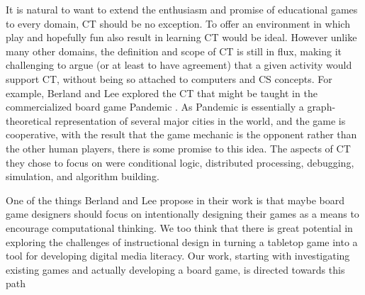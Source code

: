 \documentclass{acm_proc_article-sp}
\begin{document}
It is natural to want to extend the enthusiasm and promise of educational games to every domain, CT should be no exception.
To offer an environment in which play and hopefully fun also result in learning CT would be ideal.
However unlike many other domains, the definition and scope of CT is still in flux, making it challenging to argue (or at least to have agreement) that a given activity would support CT, without being so attached to computers and CS concepts.
For example, Berland and Lee explored the CT that might be taught in the commercialized board game Pandemic \cite{berland2011collaborative}.
As Pandemic is essentially a graph-theoretical representation of several major cities in the world, and the game is cooperative, with the result that the game mechanic is the opponent rather than the other human players, there is some promise to this idea.
The aspects of CT they chose to focus on were conditional logic, distributed processing, debugging, simulation, and algorithm building. 

One of the things Berland and Lee propose in their work is that maybe board game designers should focus on intentionally designing their games as a means to encourage computational thinking. 
We too think that there is great potential in exploring the challenges of instructional design in turning a tabletop game into a tool for developing digital media literacy. 
Our work, starting with investigating existing games and actually developing a board game, is directed towards this path


\end{document}
